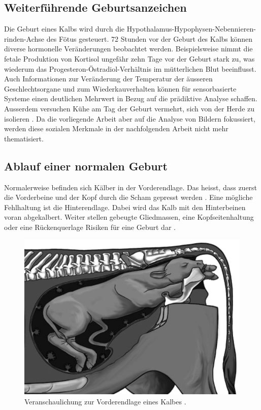 \subsection{Weiterführende Geburtsanzeichen}
Die Geburt eines Kalbs wird durch die Hypothalamus-Hypophysen-Nebennieren-rinden-Achse des Fötus gesteuert. 72 Stunden vor der Geburt des Kalbs können diverse hormonelle Veränderungen beobachtet werden. Beispielsweise nimmt die fetale Produktion von Kortisol ungefähr zehn Tage vor der Geburt stark zu, was wiederum das Progesteron-Östradiol-Verhältnis im mütterlichen Blut beeinflusst. Auch Informationen zur Veränderung der Temperatur der äusseren Geschlechtsorgane und zum Wiederkauverhalten können für sensorbasierte Systeme einen deutlichen Mehrwert in Bezug auf die prädiktive Analyse schaffen. Ausserdem versuchen Kühe am Tag der Geburt vermehrt, sich von der Herde zu isolieren \citep[S. 349-352]{Saint-Dizier2015}. 
Da die vorliegende Arbeit aber auf die Analyse von Bildern fokussiert, werden diese sozialen Merkmale in der nachfolgenden Arbeit nicht mehr thematisiert. 
\subsection{Ablauf einer normalen Geburt}
Normalerweise befinden sich Kälber in der Vorderendlage. Das heisst, dass zuerst die Vorderbeine und der Kopf durch die Scham gepresst werden \citep{Muller2020}. Eine mögliche Fehlhaltung ist die Hinterendlage. Dabei wird das Kalb mit den Hinterbeinen voran abgekalbert. Weiter stellen gebeugte Gliedmassen, eine Kopfseitenhaltung oder eine Rückenquerlage Risiken für eine Geburt dar \citep[S. 17, 24-26]{Traulsen2013}.

\begin{figure}[H]
	\center
	\includegraphics[scale=.45]{Grafiken/vorderendlage.png}
	\caption{Veranschaulichung zur Vorderendlage eines Kalbes \citep[S. 17]{Traulsen2013}.}
	\label{fig: Schwanzhebung}
\end{figure}

